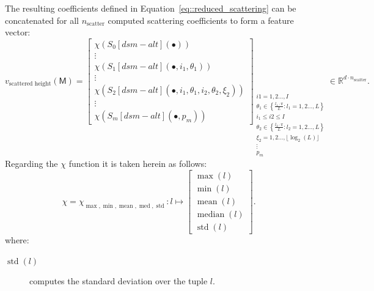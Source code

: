             The resulting coefficients defined in Equation~\ref{eq::reduced_scattering} can be concatenated for all \(n_{\text{scatter}}\) computed scattering coefficients to form a feature vector:
            \begin{equation}
                \label{eq::scatnet_height_based_features}
                v_{\text{scattered height}}\left(\mathsf{M}\right) = \begin{bmatrix}
                    \chi \left(S_0[dsm - alt]\left(\bullet\right)\right)\\
                    \vdots\\
                    \chi \left(S_1[dsm - alt]\left(\bullet, i_1, \theta_1\right)\right)\\
                    \vdots\\
                    \chi \left(S_2[dsm - alt]\left(\bullet, i_1, \theta_1, i_2, \theta_2, \xi_2\right)\right)\\
                    \vdots\\
                    \chi \left(S_m[dsm - alt]\left(\bullet, p_m\right)\right)
                \end{bmatrix}_{
                    \substack{
                        i1=1, 2 \dots, I \\
                        \theta_1 \in \left\{\frac{l_1\cdot\pi}{L}: l_1=1,2\dots,L\right\}\\
                        i_1 \leq i2 \leq I\\
                        \theta_2 \in \left\{\frac{l_2\cdot\pi}{L}: l_2=1,2\dots,L\right\}\\
                        \xi_2=1,2\dots,\lfloor\log_2(L)\rfloor\\
                        \vdots\\
                        p_m
                    }
                } \in \mathbb{R}^{d \cdot n_{\text{scatter}}}.
            \end{equation}
            Regarding the \(\chi\) function it is taken herein as follows:
            \begin{equation}
                \label{eq::max_min_mean_med_std_extractor}
                \chi = \chi_{\max,\min,\operatorname{mean},\operatorname{med},\operatorname{std}}: l \mapsto \begin{bmatrix}
                    \max(l)\\
                    \min(l)\\
                    \operatorname{mean}(l)\\
                    \operatorname{median}(l)\\
                    \operatorname{std}(l)
                \end{bmatrix}.
            \end{equation}
            where:
            \begin{description}
                \item[\(\operatorname{std}(l)\)] computes the standard deviation over the tuple \(l\).
            \end{description}


